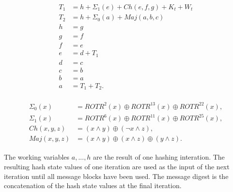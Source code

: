 \begin{align}
    \begin{split}
        T_1 &= h + \Sigma_1(e) + Ch(e,f,g) + K_{t} + W_{t} \\
        T_2 &= h + \Sigma_0(a) + Maj(a,b,c) \\
        h &= g \\
        g &= f \\
        f &= e \\
        e &= d + T_1 \\
        d &= c \\
        c &= b \\
        b &= a \\
        a &= T_1 + T_2.
    \end{split}
\label{eq:hash_iter}
\end{align}

\begin{align}
    \begin{split}
        \Sigma_{0}(x) &= ROTR^{2}(x) \oplus ROTR^{13}(x) \oplus ROTR^{22}(x), \\
        \Sigma_{1}(x) &= ROTR^{6}(x) \oplus ROTR^{11}(x) \oplus ROTR^{25}(x), \\
        Ch(x,y,z) &= (x \land y) \oplus ( \neg x \land z), \\
        Maj(x,y,z) &= (x \land y) \oplus (x \land z) \oplus (y \land z).
    \end{split}
\label{eq:Sigma_Ch_Maj}
\end{align}

The working variables $a,..., h$ are the result of one hashing interation.
The resulting hash state values of one iteration are used as the input of the
next iteration until all message blocks have been used. The message digest is
the concatenation of the hash state values at the final iteration.

